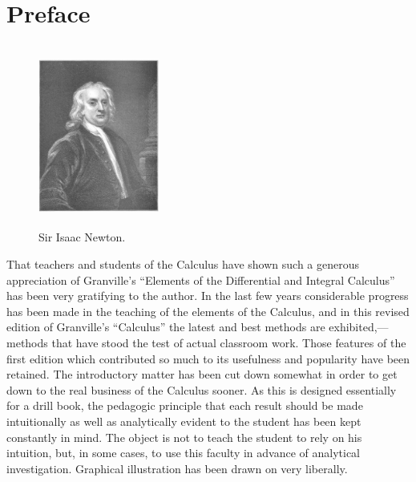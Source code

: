  
\chapter{Preface}


\begin{figure}[h]
\begin{minipage}{\textwidth}
\begin{center}
\includegraphics[height=6cm,width=4cm]{isaac-newton.eps}
\end{center}
\end{minipage}
\caption{Sir Isaac Newton.}
\label{fig:newton}
\end{figure}

That teachers and students of the Calculus have shown such a 
generous appreciation of Granville's ``Elements of the Differential 
and Integral Calculus'' has been very gratifying to the author. 
In the last few years considerable progress has been made in the 
teaching of the elements of the Calculus, and in this revised 
edition of Granville's ``Calculus'' the latest and best methods 
are exhibited,—methods that have stood the test of actual 
classroom work. Those features of the first edition which 
contributed so much to its usefulness and popularity have been 
retained. The introductory matter has been cut down somewhat in 
order to get down to the real business of the Calculus sooner. 
As this is designed essentially for a drill book, the pedagogic 
principle that each result should be made intuitionally as well 
as analytically evident to the student has been kept constantly 
in mind. The object is not to teach the student to rely on his 
intuition, but, in some cases, to use this faculty in advance 
of analytical investigation. Graphical illustration has been 
drawn on very liberally.

